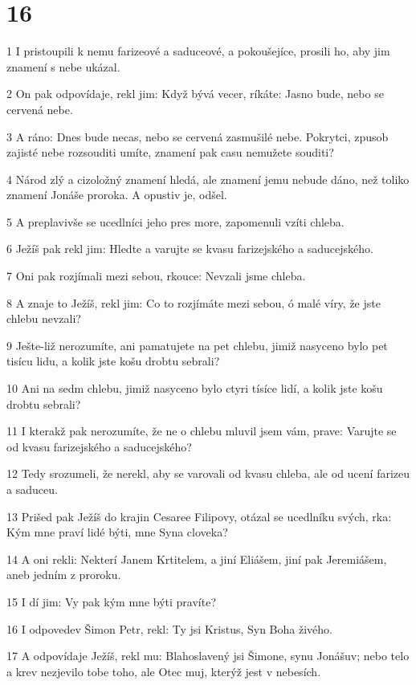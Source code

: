 \chapter{16}

\par 1 I pristoupili k nemu farizeové a saduceové, a pokoušejíce, prosili ho, aby jim znamení s nebe ukázal.
\par 2 On pak odpovídaje, rekl jim: Když bývá vecer, ríkáte: Jasno bude, nebo se cervená nebe.
\par 3 A ráno: Dnes bude necas, nebo se cervená zasmušilé nebe. Pokrytci, zpusob zajisté nebe rozsouditi umíte, znamení pak casu nemužete souditi?
\par 4 Národ zlý a cizoložný znamení hledá, ale znamení jemu nebude dáno, než toliko znamení Jonáše proroka. A opustiv je, odšel.
\par 5 A preplavivše se ucedlníci jeho pres more, zapomenuli vzíti chleba.
\par 6 Ježíš pak rekl jim: Hledte a varujte se kvasu farizejského a saducejského.
\par 7 Oni pak rozjímali mezi sebou, rkouce: Nevzali jsme chleba.
\par 8 A znaje to Ježíš, rekl jim: Co to rozjímáte mezi sebou, ó malé víry, že jste chlebu nevzali?
\par 9 Ješte-liž nerozumíte, ani pamatujete na pet chlebu, jimiž nasyceno bylo pet tisícu lidu, a kolik jste košu drobtu sebrali?
\par 10 Ani na sedm chlebu, jimiž nasyceno bylo ctyri tísíce lidí, a kolik jste košu drobtu sebrali?
\par 11 I kterakž pak nerozumíte, že ne o chlebu mluvil jsem vám, prave: Varujte se od kvasu farizejského a saducejského?
\par 12 Tedy srozumeli, že nerekl, aby se varovali od kvasu chleba, ale od ucení farizeu a saduceu.
\par 13 Prišed pak Ježíš do krajin Cesaree Filipovy, otázal se ucedlníku svých, rka: Kým mne praví lidé býti, mne Syna cloveka?
\par 14 A oni rekli: Nekterí Janem Krtitelem, a jiní Eliášem, jiní pak Jeremiášem, aneb jedním z proroku.
\par 15 I dí jim: Vy pak kým mne býti pravíte?
\par 16 I odpovedev Šimon Petr, rekl: Ty jsi Kristus, Syn Boha živého.
\par 17 A odpovídaje Ježíš, rekl mu: Blahoslavený jsi Šimone, synu Jonášuv; nebo telo a krev nezjevilo tobe toho, ale Otec muj, kterýž jest v nebesích.
